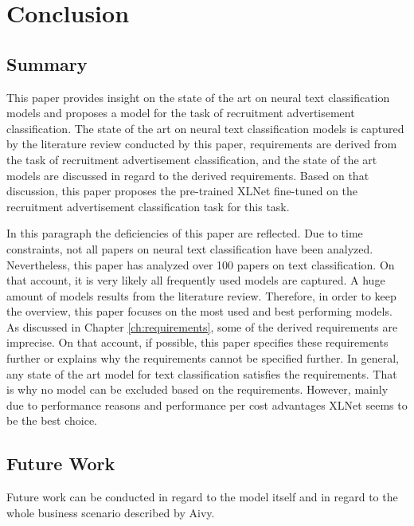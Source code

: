 \chapter{Conclusion}%
\label{ch:conclusion}
\section{Summary}
This paper provides insight on the state of the art on neural text classification models and proposes a model for the task of recruitment advertisement classification. The state of the art on neural text classification models is captured by the literature review conducted by this paper, requirements are derived from the task of recruitment advertisement classification, and the state of the art models are discussed in regard to the derived requirements. Based on that discussion, this paper proposes the pre-trained XLNet fine-tuned on the recruitment advertisement classification task for this task.
\par
In this paragraph the deficiencies of this paper are reflected. Due to time constraints, not all papers on neural text classification have been analyzed. Nevertheless, this paper has analyzed over 100 papers on text classification. On that account, it is very likely all frequently used models are captured. A huge amount of models results from the literature review. Therefore, in order to keep the overview, this paper focuses on the most used and best performing models. As discussed in Chapter \ref{ch:requirements}, some of the derived requirements are imprecise. On that account, if possible, this paper specifies these requirements further or explains why the requirements cannot be specified further. In general, any state of the art model for text classification satisfies the requirements. That is why no model can be excluded based on the requirements. However, mainly due to performance reasons and performance per cost advantages XLNet seems to be the best choice.



\section{Future Work}%
Future work can be conducted in regard to the model itself and in regard to the whole business scenario described by Aivy.
